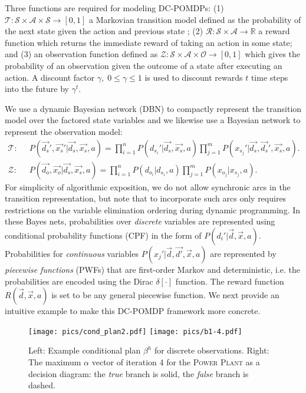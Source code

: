 \documentclass{article} %
\begin{document}
Three functions are required for modeling DC-POMDPs: (1) $\mathcal{T}: \mathcal{S} \times \mathcal{A} \times \mathcal{S} \rightarrow  [ 0, 1 ]$ a Markovian transition model defined as the probability of the next state given the action and previous state%
; (2)  $\mathcal{R}:\mathcal{S}\times\mathcal{A} \rightarrow \mathbb{R}$ a reward function which returns the immediate reward of taking an action in some state; and (3) an observation function defined as $\mathcal{Z} : \mathcal{S} \times \mathcal{A} \times \mathcal{O} \rightarrow [ 0, 1 ]$  which gives the probability of an observation given the outcome of a state after executing an action.  A discount factor $\gamma, \; 0 \leq \gamma \leq 1$ is used to discount rewards $t$ time steps into the future by $\gamma^t$.

We use a dynamic Bayesian network (DBN) to compactly represent the transition model over the factored state variables and we likewise use a Bayesian network to represent the observation model:
{\footnotesize
\begin{align*}
\mathcal{T}: \;\; &
P(\vec{d_s}',\vec{x_s}'|\vec{d_s},\vec{x_s},a) = 
\prod_{i=1}^n P(d_{s_i}'|\vec{d_s},\vec{x_s},a) \prod_{j=1}^m P(x_{s_j}'|\vec{d_s},\vec{d_s}',\vec{x_s},a). \nonumber \\
\mathcal{Z}: \;\; & 
P(\vec{d_o},\vec{x_o}|\vec{d_s},\vec{x_s},a) = 
\prod_{i=1}^n P(d_{o_i}|d_{s_i},a) \prod_{j=1}^m P(x_{o_j}|x_{s_j},a). \nonumber 
\end{align*}}
For simplicity of algorithmic exposition, we do not allow synchronic
arcs in the transition representation, but note that to incorporate
such arcs only requires restrictions on the variable elimination
ordering during dynamic programming.  In these Bayes nets, 
probabilities over 
\emph{discrete} variables are represented using conditional probability
functions (CPF) in the form of
$P(d_i'|\vec{d},\vec{x},a)$. Probabilities for \emph{continuous} variables
$P(x_j'|\vec{d},\vec{d'},\vec{x},a)$ are represented by
\emph{piecewise functions} (PWFs) that are first-order Markov
and deterministic, i.e. the probabilities are encoded using the Dirac
$\delta[\cdot]$ function. The reward function $R(\vec{d},\vec{x},a)$
is set to be any general piecewise function.  We next provide an intuitive
example to make this DC-POMDP framework more concrete.
\begin{figure}[t!]
\begin{center}
\texttt{[image: pics/cond\_plan2.pdf]}
\hspace{5mm}
\texttt{[image: pics/b1-4.pdf]}
\end{center}
\vspace{-2mm}
\caption{\footnotesize Left: Example conditional plan $\beta^h$ for discrete observations. Right: The maximum $\alpha$ vector of iteration 4 for the \textsc{Power Plant}
as a decision diagram: 
the \emph{true} branch is solid, the \emph{false}
branch is dashed.}
\label{fig:cond_plan}
\vspace{-1mm}
\end{figure}
\end{document}
